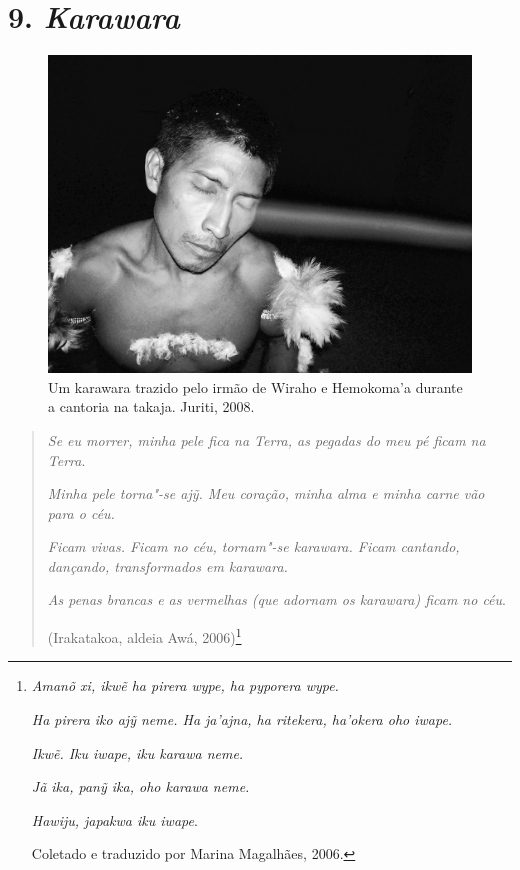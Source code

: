 
\chapter{9. \emph{Karawara}}\label{karawara}

\begin{figure}[H]
\centering
  \includegraphics[width=\textwidth]{./imgs/100_1752}
\caption{Um karawara trazido pelo irmão de Wiraho e Hemokoma’a durante a cantoria na takaja. Juriti, 2008.}
\end{figure}

\begin{quote}
\emph{Se eu morrer, minha pele fica na Terra, as pegadas do meu pé
ficam na Terra}.

\emph{Minha pele torna"-se ajỹ. Meu coração, minha alma e minha carne vão
para o céu.}

\emph{Ficam vivas. Ficam no céu, tornam"-se karawara. Ficam cantando,
dançando, transformados em karawara.}

\emph{As penas brancas e as vermelhas (que adornam os karawara) ficam no
céu}.

(Irakatakoa, aldeia Awá, 2006)\footnote{\emph{Amanõ xi, ikwẽ ha pirera
  wype, ha pyporera wype.}

  \emph{Ha pirera iko ajỹ neme. Ha ja'ajna, ha ritekera, ha'okera oho
  iwape.}

  \emph{Ikwẽ. Iku iwape, iku karawa neme.}

  \emph{Jã ika, panỹ ika, oho karawa neme.}

  \emph{Hawiju, japakwa iku iwape}.

  Coletado e traduzido por Marina Magalhães, 2006.}
\end{quote}

